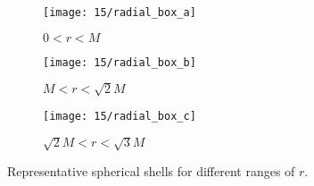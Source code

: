 \begin{figure}
	\centering
	\begin{subfigure}[b]{0.32\textwidth}
		\centering
		\texttt{[image: 15/radial\_box\_a]}
		\caption{
			$0 < r < M$
		}
	\end{subfigure}
	\hfill
	\begin{subfigure}[b]{0.32\textwidth}
		\centering
		\texttt{[image: 15/radial\_box\_b]}
		\caption{
			$M < r < \sqrt{2} M$
		}
	\end{subfigure}
	\hfill
	\begin{subfigure}[b]{0.32\textwidth}
		\centering
		\texttt{[image: 15/radial\_box\_c]}
		\caption{
			$\sqrt{2} M < r < \sqrt{3} M$
		}
	\end{subfigure}
	\caption[
		Representative spherical shells
	]{
		Representative spherical shells for different ranges of $r$.
	}
	\label{fig:radial-box}
\end{figure}


